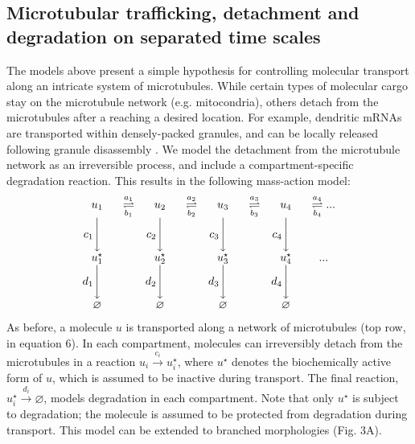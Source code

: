 \documentclass[fleqn,10pt]{wlpeerj}
\begin{document}
\subsection*{Microtubular trafficking, detachment and degradation on separated time scales}

The models above present a simple hypothesis for controlling molecular transport along an intricate system of microtubules. While certain types of molecular cargo stay on the microtubule network (e.g. mitocondria), others detach from the microtubules after a reaching a desired location. For example, dendritic mRNAs are transported within densely-packed granules, and can be locally released following granule disassembly \citep{Krichevsky_2001,Buxbaum_2014a}. We model the detachment from the microtubule network as an irreversible process, and include a compartment-specific degradation reaction. This results in the following mass-action model:
$$
\begin{array}{cccccccc}
u_1 & \overset{a_1}{\underset{b_1}{\rightleftharpoons}} &
u_2 & \overset{a_2}{\underset{b_2}{\rightleftharpoons}} &
u_3 & \overset{a_3}{\underset{b_3}{\rightleftharpoons}} &
u_4 & \overset{a_4}{\underset{b_4}{\rightleftharpoons}} ...
\\
c_1 \Bigg\downarrow \phantom{c_1} & &
c_2 \Bigg\downarrow \phantom{c_2} & &
c_3 \Bigg\downarrow \phantom{c_3} & &
c_4 \Bigg\downarrow \phantom{c_4} & 
\\
u_1^\star &  &
u_2^\star &  &
u_3^\star &  &
u_4^\star &   ...
\\
d_1 \Bigg\downarrow \phantom{d_1} & &
d_2 \Bigg\downarrow \phantom{d_2} & &
d_3 \Bigg\downarrow \phantom{d_3} & &
d_4 \Bigg\downarrow \phantom{d_4} & 
\\
\varnothing &  &
\varnothing &  &
\varnothing &  &
\varnothing &  
\end{array}
$$
As before, a molecule $u$ is transported along a network of microtubules (top row, in equation 6). In each compartment, molecules can irreversibly detach from the microtubules in a reaction $u_i \xrightarrow{c_i} u_i^\star$, where $u^\star$ denotes the biochemically active form of $u$, which is assumed to be inactive during transport. The final reaction, $u_i^\star \xrightarrow{d_i} \varnothing$, models degradation in each compartment. Note that only $u^\star$ is subject to degradation; the molecule is assumed to be protected from degradation during transport. This model can be extended to branched morphologies (Fig. 3A).
\end{document}
